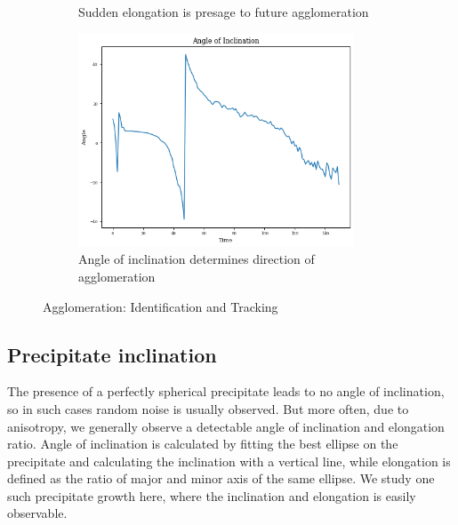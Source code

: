 \documentclass[12pt, a4paper]{report}
\begin{document}
\begin{figure}[H]
\begin{subfigure}{.45\textwidth}
  \caption{Sudden elongation is presage to future agglomeration}
  \label{img:microstrImg}
  \end{subfigure}
  \begin{subfigure}{.45\textwidth}
  \centering
  \includegraphics[width=0.9\textwidth]{Pictures/Results/2angle.jpeg}
  \caption{Angle of inclination determines direction of agglomeration}
  \label{img:microstrImg}
\end{subfigure}
\caption{Agglomeration: Identification and Tracking}
\label{fig:test}
\end{figure}



\subsection{Precipitate inclination}
The presence of a perfectly spherical precipitate leads to no angle of inclination, so in such cases random noise is usually observed. But more often, due to anisotropy, we generally observe a detectable angle of inclination and elongation ratio. Angle of inclination is calculated by fitting the best ellipse on the precipitate and calculating the inclination with a vertical line, while elongation is defined as the ratio of major and minor axis of the same ellipse. We study one such precipitate growth here, where the inclination and elongation is easily observable.
\end{document}
